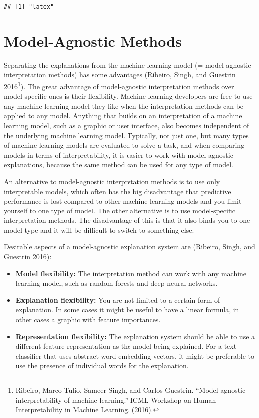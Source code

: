 \documentclass[
  11pt,
]{scrbook}
\providecommand{\tightlist}{%
  \setlength{\itemsep}{0pt}\setlength{\parskip}{0pt}}
\begin{document}
\begin{verbatim}
## [1] "latex"
\end{verbatim}

\hypertarget{agnostic}{%
\chapter{Model-Agnostic Methods}\label{agnostic}}

Separating the explanations from the machine learning model (= model-agnostic interpretation methods) has some advantages (Ribeiro, Singh, and Guestrin 2016\footnote{Ribeiro, Marco Tulio, Sameer Singh, and Carlos Guestrin. ``Model-agnostic interpretability of machine learning.'' ICML Workshop on Human Interpretability in Machine Learning. (2016).}).
The great advantage of model-agnostic interpretation methods over model-specific ones is their flexibility.
Machine learning developers are free to use any machine learning model they like when the interpretation methods can be applied to any model.
Anything that builds on an interpretation of a machine learning model, such as a graphic or user interface, also becomes independent of the underlying machine learning model.
Typically, not just one, but many types of machine learning models are evaluated to solve a task, and when comparing models in terms of interpretability, it is easier to work with model-agnostic explanations, because the same method can be used for any type of model.

An alternative to model-agnostic interpretation methods is to use only \protect\hyperlink{simple}{interpretable models}, which often has the big disadvantage that predictive performance is lost compared to other machine learning models and you limit yourself to one type of model.
The other alternative is to use model-specific interpretation methods.
The disadvantage of this is that it also binds you to one model type and it will be difficult to switch to something else.

Desirable aspects of a model-agnostic explanation system are (Ribeiro, Singh, and Guestrin 2016):

\begin{itemize}
\tightlist
\item
  \textbf{Model flexibility:}
  The interpretation method can work with any machine learning model, such as random forests and deep neural networks.
\item
  \textbf{Explanation flexibility:}
  You are not limited to a certain form of explanation.
  In some cases it might be useful to have a linear formula, in other cases a graphic with feature importances.
\item
  \textbf{Representation flexibility:}
  The explanation system should be able to use a different feature representation as the model being explained.
  For a text classifier that uses abstract word embedding vectors, it might be preferable to use the presence of individual words for the explanation.
\end{itemize}
\end{document}
